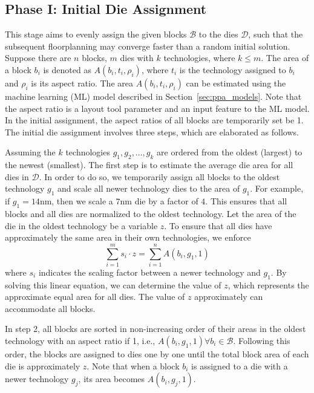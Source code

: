 \subsection{Phase I: Initial Die Assignment}
\label{sec:initial_assig}

This stage aims to evenly assign the given blocks $\mathcal{B}$ to the dies $\mathcal{D}$, such that the subsequent floorplanning may converge faster than a random initial solution.
Suppose there are $n$ blocks, $m$ dies with 
$k$ technologies, where $k \le m$. The area
of a block $b_i$ is denoted as $A(b_i, t_i, \rho_i)$, where $t_i$ is the technology assigned to $b_i$ and $\rho_i$ is its aspect ratio. 
The area $A(b_i, t_i, \rho_i)$ can be estimated using the machine learning (ML) model described in
Section~\ref{sec:ppa_models}. Note that the aspect ratio is a layout tool parameter and an input feature to the ML model. In the initial assignment, the aspect ratios of all blocks are temporarily set be 1.
The initial die assignment involves three steps, which are elaborated as follows.

Assuming the $k$ technologies $g_1, g_2, ..., g_k$ are ordered from the oldest (largest) to the newest (smallest). The first step is to estimate the average die area for 
all dies in $\mathcal{D}$. In order to do so, we temporarily assign all blocks to the oldest technology $g_1$ and scale all newer technology dies to the area of $g_1$. For example, if $g_1=14$nm, then we scale a $7$nm die by a factor of $4$. This ensures that all blocks and all dies are normalized to the oldest technology. 
Let the area of the die in the oldest technology be a variable $z$. To ensure that all dies have approximately the same area in their own technologies, we enforce
\[
\sum_{i=1}^m s_i \cdot z = \sum_{i=1}^n A(b_i, g_1, 1)
\]
where $s_i$ indicates the scaling factor between a newer technology and $g_1$.
By solving this linear equation, we can determine the value of $z$, which represents the approximate equal area for all dies. The value of $z$ approximately can accommodate all blocks.

In step 2, all blocks are sorted in non-increasing order of their areas in the oldest technology with an aspect ratio if 1, i.e., $A(b_i, g_1, 1) \forall b_i \in \mathcal{B}$. Following this order, the blocks are assigned to dies one by one until the total block area of each die is approximately $z$. Note that when a block $b_i$ is assigned to a die with a newer technology $g_j$, its area becomes $A(b_i, g_j, 1)$.

